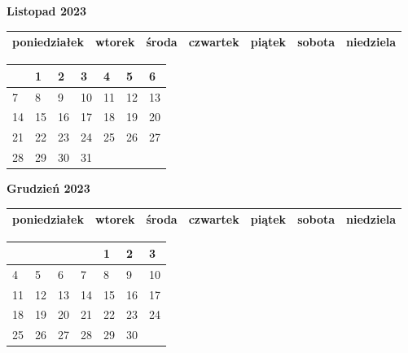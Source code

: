 \clearpage

\begin{landscape}
    \begin{center}
        \textbf{\huge{Listopad 2023}}
    \end{center}

    \vspace{-3mm}

    \thispagestyle{empty}
    \noindent
    \begin{tabularx}{28.7cm}{|Y|Y|Y|Y|Y|Y|Y|}
        \hline
poniedziałek & wtorek & środa & czwartek & piątek & sobota & niedziela \\ [-0.5mm]
        \hline
    \end{tabularx}

    \vspace{-0.5mm}

    \noindent
    \begin{tabularx}{28.7cm}{|X|X|X|X|X|X|X|}
        \hline
& 1 & 2 & 3 & 4 & 5 & 6 \\ [31.0mm]
\hline
7 & 8 & 9 & 10 & 11 & 12 & 13 \\ [31.0mm]
\hline
14 & 15 & 16 & 17 & 18 & 19 & 20 \\ [31.0mm]
\hline
21 & 22 & 23 & 24 & 25 & 26 & 27 \\ [31.0mm]
\hline
28 & 29 & 30 & 31 & & & \\ [31.0mm]
\hline

    \end{tabularx}
\end{landscape}

\clearpage

\begin{landscape}
    \begin{center}
        \textbf{\huge{Grudzień 2023}}
    \end{center}

    \vspace{-3mm}

    \thispagestyle{empty}
    \noindent
    \begin{tabularx}{28.7cm}{|Y|Y|Y|Y|Y|Y|Y|}
        \hline
poniedziałek & wtorek & środa & czwartek & piątek & sobota & niedziela \\ [-0.5mm]
        \hline
    \end{tabularx}

    \vspace{-0.5mm}

    \noindent
    \begin{tabularx}{28.7cm}{|X|X|X|X|X|X|X|}
        \hline
& & & & 1 & 2 & 3 \\ [31.0mm]
\hline
4 & 5 & 6 & 7 & 8 & 9 & 10 \\ [31.0mm]
\hline
11 & 12 & 13 & 14 & 15 & 16 & 17 \\ [31.0mm]
\hline
18 & 19 & 20 & 21 & 22 & 23 & 24 \\ [31.0mm]
\hline
25 & 26 & 27 & 28 & 29 & 30 & \\ [31.0mm]
\hline

    \end{tabularx}
\end{landscape}

\clearpage

